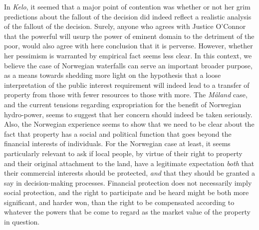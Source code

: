 In \emph{Kelo}, it seemed that a major point of contention was whether or not her grim predictions about the fallout of the decision did indeed reflect a realistic analysis of the fallout of the decision. Surely, anyone who agrees with Justice O'Connor that the powerful will usurp the power of eminent domain to the detriment of the poor, would also agree with here conclusion that it is perverse. However, whether her pessimism is warranted by empirical fact seems less clear. In this context, we believe the case of Norwegian waterfalls can serve an important broader purpose, as a means towards shedding more light on the hypothesis that a loose interpretation of the public interest requirement will indeed lead to a transfer of property from those with fewer resources to those with more. The \emph{Måland} case, and the current tensions regarding expropriation for the benefit of Norwegian hydro-power, seems to suggest that her concern should indeed be taken seriously. Also, the Norwegian experience seems to show that we need to be clear about the fact that property has a social and political function that goes beyond the financial interests of individuals. For the Norwegian case at least, it seems particularly relevant to ask if local people, by virtue of their right to property and their original attachment to the land, have a legitimate expectation \emph{both} that their commercial interests should be protected, \emph{and} that they should be granted a say in decision-making processes. Financial protection does not necessarily imply social protection, and the right to participate and be heard might be both more significant, and harder won, than the right to be compensated according to whatever the powers that be come to regard as the market value of the property in question.

